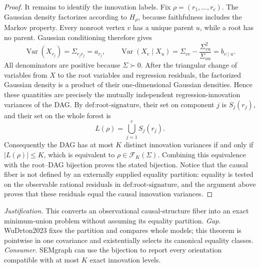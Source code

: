 \documentclass{article}
\begin{document}
\begin{proof}
It remains to identify the innovation labels.  Fix \(\rho=(r_1,\ldots,r_c)\).  The Gaussian density factorizes according to \(H_\rho\), because faithfulness includes the Markov property.  Every nonroot vertex \(v\) has a unique parent \(u\), while a root has no parent.  Gaussian conditioning therefore gives
\[
 \operatorname{Var}(X_{r_j})=\Sigma_{r_jr_j}=a_{r_j},
 \qquad
 \operatorname{Var}(X_v\mid X_u)
 =\Sigma_{vv}-\frac{\Sigma_{vu}^{2}}{\Sigma_{uu}}
 =b_{v\mid u}.
\]
All denominators are positive because \(\Sigma\succ0\).  After the triangular change of variables from \(X\) to the root variables and regression residuals, the factorized Gaussian density is a product of their one-dimensional Gaussian densities.  Hence these quantities are precisely the mutually independent regression-innovation variances of the DAG.  By \(\text{def:root-signature}\), their set on component \(j\) is \(S_j(r_j)\), and their set on the whole forest is
\[
 L(\rho)=\bigcup_{j=1}^{c}S_j(r_j).
\]
Consequently the DAG has at most \(K\) distinct innovation variances if and only if \(|L(\rho)|\le K\), which is equivalent to \(\rho\in\mathcal F_K(\Sigma)\).  Combining this equivalence with the root--DAG bijection proves the stated bijection.  Notice that the causal fiber is not defined by an externally supplied equality partition: equality is tested on the observable rational residuals in \(\text{def:root-signature}\), and the argument above proves that these residuals equal the causal innovation variances.
\end{proof}
\par\smallskip\noindent \textit{Justification.} This converts an observational causal-structure fiber into an exact minimum-union problem without assuming its equality partition. \textit{Gap.} WuDrton2023 fixes the partition and compares whole models; this theorem is pointwise in one covariance and existentially selects its canonical equality classes. \textit{Consumer.} SEMgraph can use the bijection to report every orientation compatible with at most \(K\) exact innovation levels.
\end{document}
